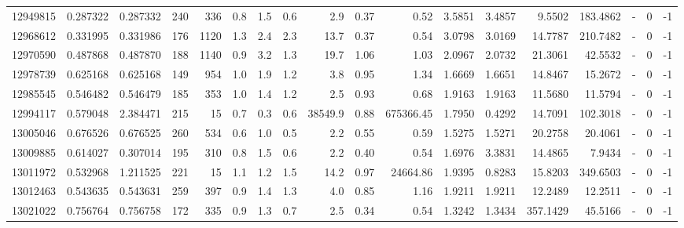 \begin{tabular}{rrrrrrrrrrrrrrrlrr}
  12949815 & 0.287322 &   0.287332 &  240 &  336 &      0.8 &      1.5 &     0.6 &      2.9 &       0.37 &        0.52 &  3.5851 &  3.4857 &    9.5502 &  183.4862 &             - &        0 &         -1 \\
  12968612 & 0.331995 &   0.331986 &  176 & 1120 &      1.3 &      2.4 &     2.3 &     13.7 &       0.37 &        0.54 &  3.0798 &  3.0169 &   14.7787 &  210.7482 &             - &        0 &         -1 \\
  12970590 & 0.487868 &   0.487870 &  188 & 1140 &      0.9 &      3.2 &     1.3 &     19.7 &       1.06 &        1.03 &  2.0967 &  2.0732 &   21.3061 &   42.5532 &             - &        0 &         -1 \\
  12978739 & 0.625168 &   0.625168 &  149 &  954 &      1.0 &      1.9 &     1.2 &      3.8 &       0.95 &        1.34 &  1.6669 &  1.6651 &   14.8467 &   15.2672 &             - &        0 &         -1 \\
  12985545 & 0.546482 &   0.546479 &  185 &  353 &      1.0 &      1.4 &     1.2 &      2.5 &       0.93 &        0.68 &  1.9163 &  1.9163 &   11.5680 &   11.5794 &             - &        0 &         -1 \\
  12994117 & 0.579048 &   2.384471 &  215 &   15 &      0.7 &      0.3 &     0.6 &  38549.9 &       0.88 &   675366.45 &  1.7950 &  0.4292 &   14.7091 &  102.3018 &             - &        0 &         -1 \\
  13005046 & 0.676526 &   0.676525 &  260 &  534 &      0.6 &      1.0 &     0.5 &      2.2 &       0.55 &        0.59 &  1.5275 &  1.5271 &   20.2758 &   20.4061 &             - &        0 &         -1 \\
  13009885 & 0.614027 &   0.307014 &  195 &  310 &      0.8 &      1.5 &     0.6 &      2.2 &       0.40 &        0.54 &  1.6976 &  3.3831 &   14.4865 &    7.9434 &             - &        0 &         -1 \\
  13011972 & 0.532968 &   1.211525 &  221 &   15 &      1.1 &      1.2 &     1.5 &     14.2 &       0.97 &    24664.86 &  1.9395 &  0.8283 &   15.8203 &  349.6503 &             - &        0 &         -1 \\
  13012463 & 0.543635 &   0.543631 &  259 &  397 &      0.9 &      1.4 &     1.3 &      4.0 &       0.85 &        1.16 &  1.9211 &  1.9211 &   12.2489 &   12.2511 &             - &        0 &         -1 \\
  13021022 & 0.756764 &   0.756758 &  172 &  335 &      0.9 &      1.3 &     0.7 &      2.5 &       0.34 &        0.54 &  1.3242 &  1.3434 &  357.1429 &   45.5166 &             - &        0 &         -1 \\

\end{tabular}
